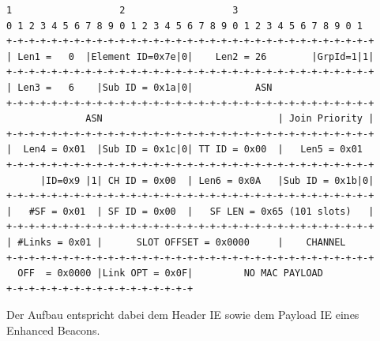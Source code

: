 \begin{lstlisting}[frame=single]
1                   2                   3
0 1 2 3 4 5 6 7 8 9 0 1 2 3 4 5 6 7 8 9 0 1 2 3 4 5 6 7 8 9 0 1
+-+-+-+-+-+-+-+-+-+-+-+-+-+-+-+-+-+-+-+-+-+-+-+-+-+-+-+-+-+-+-+-+
| Len1 =   0  |Element ID=0x7e|0|    Len2 = 26        |GrpId=1|1|
+-+-+-+-+-+-+-+-+-+-+-+-+-+-+-+-+-+-+-+-+-+-+-+-+-+-+-+-+-+-+-+-+
| Len3 =   6    |Sub ID = 0x1a|0|           ASN
+-+-+-+-+-+-+-+-+-+-+-+-+-+-+-+-+-+-+-+-+-+-+-+-+-+-+-+-+-+-+-+-+
              ASN                               | Join Priority |
+-+-+-+-+-+-+-+-+-+-+-+-+-+-+-+-+-+-+-+-+-+-+-+-+-+-+-+-+-+-+-+-+
|  Len4 = 0x01  |Sub ID = 0x1c|0| TT ID = 0x00  |   Len5 = 0x01
+-+-+-+-+-+-+-+-+-+-+-+-+-+-+-+-+-+-+-+-+-+-+-+-+-+-+-+-+-+-+-+-+
      |ID=0x9 |1| CH ID = 0x00  | Len6 = 0x0A   |Sub ID = 0x1b|0|
+-+-+-+-+-+-+-+-+-+-+-+-+-+-+-+-+-+-+-+-+-+-+-+-+-+-+-+-+-+-+-+-+
|   #SF = 0x01  | SF ID = 0x00  |   SF LEN = 0x65 (101 slots)   |
+-+-+-+-+-+-+-+-+-+-+-+-+-+-+-+-+-+-+-+-+-+-+-+-+-+-+-+-+-+-+-+-+
| #Links = 0x01 |      SLOT OFFSET = 0x0000     |    CHANNEL
+-+-+-+-+-+-+-+-+-+-+-+-+-+-+-+-+-+-+-+-+-+-+-+-+-+-+-+-+-+-+-+-+
  OFF  = 0x0000 |Link OPT = 0x0F|         NO MAC PAYLOAD
+-+-+-+-+-+-+-+-+-+-+-+-+-+-+-+-+
\end{lstlisting}

Der Aufbau entspricht dabei dem Header IE sowie dem Payload IE eines
Enhanced Beacons.

